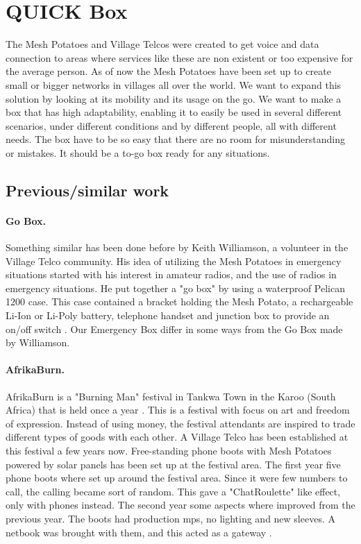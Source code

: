 \section{QUICK Box}
The Mesh Potatoes and Village Telcos were created to get voice and data connection to areas where services like these are non existent or too expensive for the average person. As of now the Mesh Potatoes have been set up to create small or bigger networks in villages all over the world. We want to expand this solution by looking at its mobility and its usage on the go. We want to make a box that has high adaptability, enabling it to easily be used in several different scenarios, under different conditions and by different people, all with different needs. The box have to be so easy that there are no room for misunderstanding or mistakes. It should be a to-go box ready for any situations.  
 
\subsection{Previous/similar work}
\paragraph{Go Box.} Something similar has been done before by Keith Williamson, a volunteer in the Village Telco community. His idea of utilizing the Mesh Potatoes in emergency situations started with his interest in amateur radios, and the use of radios in emergency situations. He put together a "go box" by using a waterproof Pelican 1200 case. This case contained a bracket holding the Mesh Potato, a rechargeable Li-Ion or Li-Poly battery, telephone handset and junction box to provide an on/off switch \cite{keith}. Our Emergency Box differ in some ways from the Go Box made by Williamson. 

\paragraph{AfrikaBurn.}
AfrikaBurn is a "Burning Man" festival in Tankwa Town in the Karoo (South Africa) that is held once a year \cite{whatisafrikaburn}. This is a festival with focus on art and freedom of expression. Instead of using money, the festival attendants are inspired to trade different types of goods with each other. A Village Telco has been established at this festival a few years now. Free-standing phone boots with Mesh Potatoes powered by solar panels has been set up at the festival area. The first year five phone boots where set up around the festival area. Since it were few numbers to call, the calling became sort of random. This gave a  "ChatRoulette" like effect, only with phones instead. The second year some aspects where improved from the previous year. The boots had production \glspl{mp}, no lighting and new sleeves. A netbook was brought with them, and this acted as a gateway \cite{africaburnforavillagetelco,africaburnsagainforavillagetelco}. 

